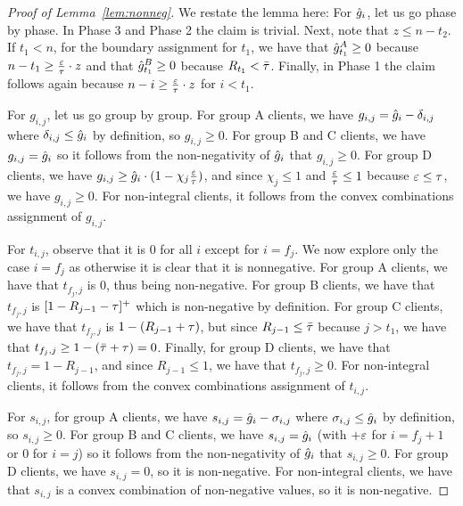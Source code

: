 \begin{proof}[Proof of Lemma~\ref{lem:nonneg}]
We restate the lemma here:
\lemnonneg*
For $\hat{g}_i$, let us go phase by phase.
In Phase 3 and Phase 2 the claim is trivial.
Next, note that $z \leq n - t_2$.
If $t_1 < n$, for the boundary assignment for $t_1$, we have that $\hat{g}_{t_1}^A \geq 0$ because $n - t_1 \geq \frac{\varepsilon}{\tau} \cdot z$ and that $\hat{g}_{t_1}^B \geq 0$ because $R_{t_1} < \bar\tau$. 
Finally, in Phase 1 the claim follows again because $n - i \geq \frac{\varepsilon}{\tau} \cdot z$ for $i < t_1$.

For $g_{i,j}$, let us go group by group.
For group A clients, we have $g_{i,j} = \hat{g}_i - \delta_{i,j}$ where $\delta_{i,j} \leq \hat{g}_i$ by definition, so $g_{i,j} \geq 0$. For group B and C clients, we have $g_{i,j} = \hat{g}_i$ so it follows from the non-negativity of $\hat{g}_i$ that $g_{i,j} \geq 0$. For group D clients, we have $g_{i,j} \geq \hat{g}_i\cdot(1 - \chi_j \frac{\varepsilon}{\tau})$, and since $\chi_j \leq 1$ and $\frac{\varepsilon}{\tau} \leq 1$ because $\varepsilon \leq \tau$, we have $g_{i,j} \geq 0$.
For non-integral clients, it follows from the convex combinations assignment of $g_{i,j}$.

For $t_{i,j}$, observe that it is $0$ for all $i$ except for $i=f_j$. We now explore only the case $i=f_j$ as otherwise it is clear that it is nonnegative. For group A clients, we have that $t_{f_j,j}$ is $0$, thus being non-negative. For group B clients, we have that $t_{f_j,j}$ is $[1-R_{j-1}-\tau]^+$ which is non-negative by definition. For group C clients, we have that $t_{f_j,j}$ is $1 - (R_{j-1}+\tau)$, but since $R_{j-1} \leq \bar\tau$ because $j > t_1$, we have that $t_{f_j,j} \geq 1 - (\bar\tau + \tau) = 0$.
Finally, for group D clients, we have that $t_{f_j,j} = 1-R_{j-1}$, and since $R_{j-1} \leq 1$, we have that $t_{f_j,j} \geq 0$.
For non-integral clients, it follows from the convex combinations assignment of $t_{i,j}$.

For $s_{i,j}$, for group A clients, we have $s_{i,j} = \hat{g}_i - \sigma_{i,j}$ where $\sigma_{i,j} \leq \hat{g}_i$ by definition, so $s_{i,j} \geq 0$. For group B and C clients, we have $s_{i,j} = \hat{g}_i$ (with $+\varepsilon$ for $i=f_j+1$ or $0$ for $i=j$) so it follows from the non-negativity of $\hat{g}_i$ that $s_{i,j} \geq 0$. For group D clients, we have $s_{i,j} = 0$, so it is non-negative.
For non-integral clients, we have that $s_{i,j}$ is a convex combination of non-negative values, so it is non-negative.
\end{proof}

